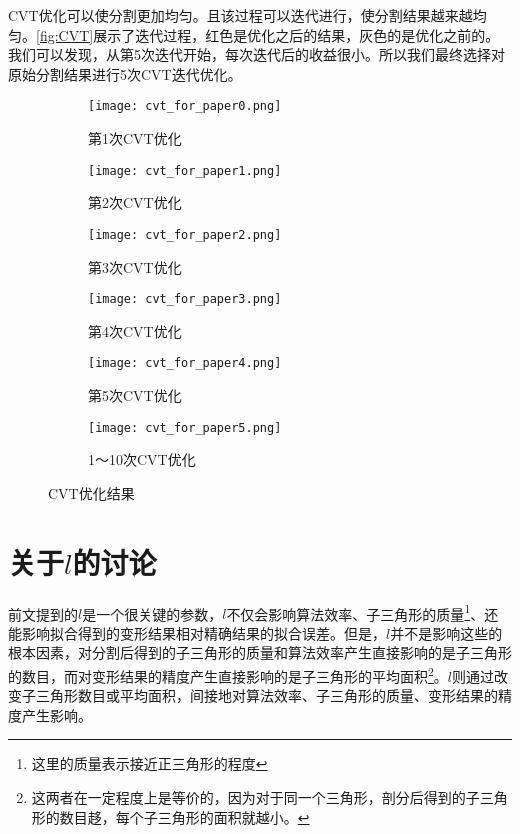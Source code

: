 CVT\cite{du1999}优化可以使分割更加均匀。且该过程可以迭代进行，使分割结果越来越均匀。\autoref{fig:CVT}展示了迭代过程，红色是优化之后的结果，灰色的是优化之前的。我们可以发现，从第5次迭代开始，每次迭代后的收益很小。所以我们最终选择对原始分割结果进行5次CVT迭代优化。

\begin{figure}[htbp]
	\centering
	\begin{subfigure}[b]{.49\textwidth}
		\centering
		\texttt{[image: cvt\_for\_paper0.png]}
		\caption{第1次CVT优化}
	\end{subfigure}
	\begin{subfigure}[b]{.49\textwidth}
		\centering
		\texttt{[image: cvt\_for\_paper1.png]}
		\caption{第2次CVT优化}
	\end{subfigure}

	\begin{subfigure}[b]{.49\textwidth}
		\centering
		\texttt{[image: cvt\_for\_paper2.png]}
		\caption{第3次CVT优化}
	\end{subfigure}
	\begin{subfigure}[b]{.49\textwidth}
		\centering
		\texttt{[image: cvt\_for\_paper3.png]}
		\caption{第4次CVT优化}
	\end{subfigure}

	\begin{subfigure}[b]{.49\textwidth}
		\centering
		\texttt{[image: cvt\_for\_paper4.png]}
		\caption{第5次CVT优化}
	\end{subfigure}
	\begin{subfigure}[b]{.49\textwidth}
		\centering
		\texttt{[image: cvt\_for\_paper5.png]}
		\caption{1～10次CVT优化}
	\end{subfigure}
    \caption{CVT优化结果} \label{fig:CVT}
\end{figure}

\section{关于$l$的讨论}
前文提到的$l$是一个很关键的参数，$l$不仅会影响算法效率、子三角形的质量\footnote{这里的质量表示接近正三角形的程度}、还能影响拟合得到的变形结果相对精确结果的拟合误差。但是，$l$并不是影响这些的根本因素，对分割后得到的子三角形的质量和算法效率产生直接影响的是子三角形的数目，而对变形结果的精度产生直接影响的是子三角形的平均面积\footnote{这两者在一定程度上是等价的，因为对于同一个三角形，剖分后得到的子三角形的数目趍，每个子三角形的面积就越小。}。$l$则通过改变子三角形数目或平均面积，间接地对算法效率、子三角形的质量、变形结果的精度产生影响。

